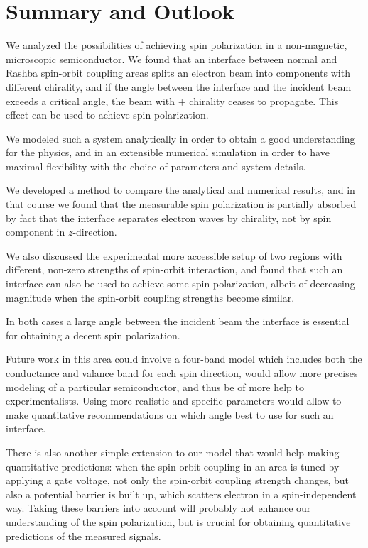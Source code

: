\chapter{Summary and Outlook}
\label{sec:summary}

We analyzed the possibilities of achieving spin polarization in a
non-magnetic, microscopic semiconductor. We found that an interface between
normal and Rashba spin-orbit coupling areas splits an electron beam into
components with different chirality, and if the angle between the interface
and the incident beam exceeds a critical angle, the beam with $+$ chirality
ceases to propagate. This effect can be used to achieve spin polarization.

We modeled such a system analytically in order to obtain a good understanding
for the physics, and in an extensible numerical simulation in order to have
maximal flexibility with the choice of parameters and system details.

We developed a method to compare the analytical and numerical results, and in
that course we found that the measurable spin polarization is partially
absorbed by fact that the
interface separates electron waves by chirality, not by spin component
in $z$-direction.

We also discussed the experimental more accessible setup of two regions with
different, non-zero strengths of spin-orbit interaction, and found that such an
interface can also be used to achieve some spin polarization, albeit
of decreasing magnitude when the spin-orbit coupling strengths become similar. 

In both cases a large angle between the incident beam the interface is
essential for obtaining a decent spin polarization.

Future work in this area could involve a four-band model which includes both
the conductance and valance band for each spin direction, would
allow more precises modeling of a particular semiconductor, and thus be of
more help to experimentalists. Using more realistic and specific parameters
would allow to make quantitative recommendations on which angle best to use
for such an interface.

There is also another simple extension to our model that would help making
quantitative predictions: when the spin-orbit coupling in an area is tuned by
applying a gate voltage, not only the spin-orbit coupling strength changes,
but also a potential barrier is built up, which scatters electron in a
spin-independent way. Taking these barriers into account will probably not
enhance our understanding of the spin polarization, but is crucial for
obtaining quantitative predictions of the measured signals.

